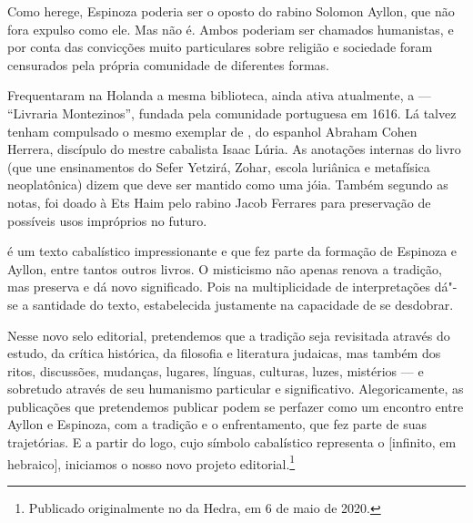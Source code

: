 Como herege, Espinoza poderia ser o oposto do rabino Solomon Ayllon, que não fora expulso como ele. Mas não é. Ambos poderiam ser chamados humanistas, e por conta das convicções muito particulares sobre religião e sociedade foram censurados pela própria comunidade de diferentes formas. 

Frequentaram na Holanda a mesma biblioteca, ainda ativa atualmente, a {} --- ``Livraria Montezinos'', fundada pela comunidade portuguesa em 1616. Lá talvez tenham compulsado o mesmo exemplar de {}, do espanhol Abraham Cohen Herrera, discípulo do mestre cabalista Isaac Lúria. As anotações internas do livro (que une ensinamentos do Sefer Yetzirá, Zohar, escola luriânica e metafísica neoplatônica) dizem que deve ser mantido como uma jóia. Também segundo as notas, foi doado à Ets Haim pelo rabino Jacob Ferrares para preservação de possíveis usos impróprios no futuro. 

{} é um texto cabalístico impressionante e que fez parte da formação de Espinoza e Ayllon, entre tantos outros livros. O misticismo não apenas renova a tradição, mas preserva e dá novo significado. Pois na multiplicidade de interpretações dá"-se a santidade do texto, estabelecida justamente na capacidade de se desdobrar.

Nesse novo selo editorial, pretendemos que a tradição seja revisitada através do estudo, da crítica histórica, da filosofia e literatura judaicas, mas também dos ritos, discussões, mudanças, lugares, línguas, culturas, luzes, mistérios --- e sobretudo através de seu humanismo particular e significativo. Alegoricamente, as publicações que pretendemos publicar podem se perfazer como um encontro entre Ayllon e Espinoza, com a tradição e o enfrentamento, que fez parte de suas trajetórias. E a partir do logo, cujo símbolo cabalístico representa o {} [infinito, em hebraico], iniciamos o nosso novo projeto editorial.\footnote{Publicado originalmente no {} da Hedra, em 6 de maio de 2020.}

\pagebreak
